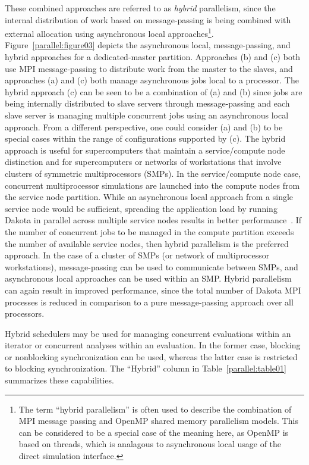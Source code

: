 These combined approaches are referred to as \emph{hybrid}
parallelism, since the internal distribution of work based on
message-passing is being combined with external allocation using
asynchronous local approaches\footnote{The term ``hybrid parallelism''
is often used to describe the combination of MPI message passing and
OpenMP shared memory parallelism models.  This can be considered to be
a special case of the meaning here, as OpenMP is based on threads,
which is analagous to asynchronous local usage of the direct
simulation interface.}.  Figure~\ref{parallel:figure03} depicts the
asynchronous local, message-passing, and hybrid approaches for a
dedicated-master partition. Approaches (b) and (c) both use MPI
message-passing to distribute work from the master to the slaves, and
approaches (a) and (c) both manage asynchronous jobs local to a
processor. The hybrid approach (c) can be seen to be a combination of
(a) and (b) since jobs are being internally distributed to slave
servers through message-passing and each slave server is managing
multiple concurrent jobs using an asynchronous local approach. From a
different perspective, one could consider (a) and (b) to be special
cases within the range of configurations supported by (c). The hybrid
approach is useful for supercomputers that maintain a service/compute
node distinction and for supercomputers or networks of workstations
that involve clusters of symmetric multiprocessors (SMPs). In the
service/compute node case, concurrent multiprocessor simulations are
launched into the compute nodes from the service node partition. While
an asynchronous local approach from a single service node would be
sufficient, spreading the application load by running Dakota in
parallel across multiple service nodes results in better
performance~\cite{Eld00}. If the number of concurrent jobs to be
managed in the compute partition exceeds the number of available
service nodes, then hybrid parallelism is the preferred approach. In
the case of a cluster of SMPs (or network of multiprocessor
workstations), message-passing can be used to communicate between
SMPs, and asynchronous local approaches can be used within an
SMP. Hybrid parallelism can again result in improved performance,
since the total number of Dakota MPI processes is reduced in
comparison to a pure message-passing approach over all processors.

Hybrid schedulers may be used for managing concurrent evaluations
within an iterator or concurrent analyses within an evaluation.  In
the former case, blocking or nonblocking synchronization can be used,
whereas the latter case is restricted to blocking synchronization.
The ``Hybrid'' column in Table~\ref{parallel:table01} summarizes these
capabilities.

